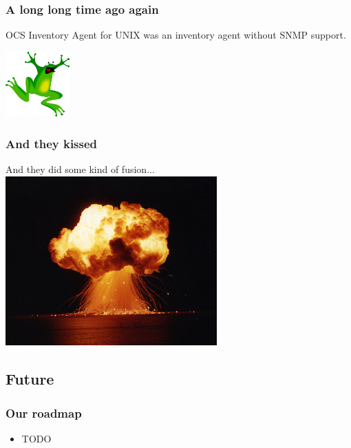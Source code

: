 \documentclass{beamer}
\begin{document}
\begin{frame}
    \frametitle{A long long time ago again}
    
    OCS Inventory Agent for UNIX was an inventory agent without SNMP support.

    \includegraphics[height=2.5cm]{./pics/frog2.pdf}
\end{frame}

\begin{frame}
    \frametitle{And they kissed}
    
    And they did some kind of fusion...
    \includegraphics[height=6.5cm]{./pics/explode.jpg}
\end{frame}


\subsection{Future}

%
\begin{frame}
    \frametitle{Our roadmap}
    \begin{itemize}
        \item TODO
    \end{itemize}
\end{frame}
\end{document}
